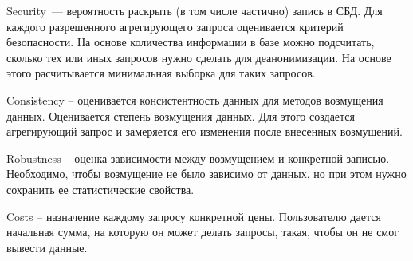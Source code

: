 Security~--- вероятность раскрыть (в том числе частично) запись в СБД. Для каждого разрешенного агрегирующего запроса оценивается критерий безопасности. На основе количества информации в базе можно подсчитать, сколько тех или иных запросов нужно сделать для деанонимизации. На основе этого расчитывается минимальная выборка для таких запросов.

Consistency -- оценивается консистентность данных для методов возмущения данных. Оценивается степень возмущения данных. Для этого создается агрегирующий запрос и замеряется его изменения после внесенных возмущений.

Robustness -- оценка зависимости между возмущением и конкретной записью. Необходимо, чтобы возмущение не было зависимо от данных, но при этом нужно сохранить ее статистические свойства.

Costs -- назначение каждому запросу конкретной цены. Пользователю дается начальная сумма, на которую он может делать запросы, такая, чтобы он не смог вывести данные.
